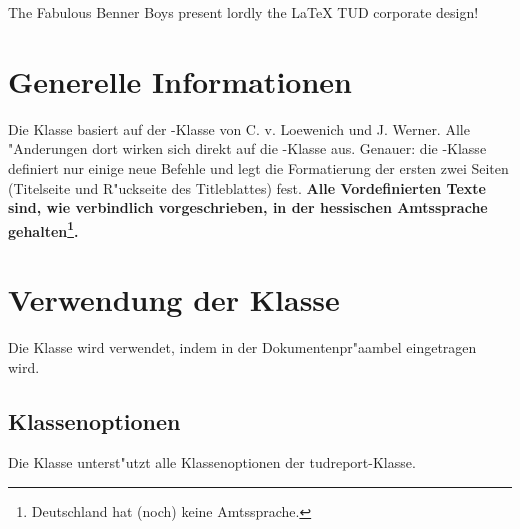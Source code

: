 \documentclass[article,dr=phil,type=drfinal,colorback,accentcolor=tud9c]{tudthesis}
\begin{document}
    {The Fabulous Benner Boys present lordly the {\LaTeX} TUD corporate design!}
  \author{Johnnie Walker}
  \dateofexam{\today}{\today}
  \makethesistitle

  \section{Generelle Informationen}
    Die Klasse basiert auf der -Klasse von C. v. Loewenich und
    J. Werner. Alle "Anderungen dort wirken sich direkt auf die
    -Klasse aus. Genauer: die -Klasse definiert nur einige
    neue Befehle und legt die Formatierung der ersten zwei Seiten (Titelseite
    und R"uckseite des Titleblattes) fest. \textbf{Alle Vordefinierten Texte sind, wie verbindlich vorgeschrieben, in der hessischen Amtssprache
    gehalten\footnote{Deutschland hat (noch) keine Amtssprache.}.}

  \section{Verwendung der Klasse}
    Die Klasse wird verwendet, indem in der Dokumentenpr"aambel
    eingetragen wird.

  \subsection{Klassenoptionen}
    Die Klasse unterst"utzt alle Klassenoptionen der tudreport-Klasse.
\end{document}
